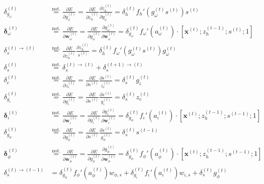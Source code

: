 \documentclass[11pt]{article}
\begin{document}
\begin{align}
    \delta_{g_{\omega}}^{(t)} &\overset{\text{not.}}{=} \displaystyle \frac{\partial E}{\partial g_{\omega}^{(t)}} = \displaystyle \frac{\partial E}{\partial z_{h}^{(t)}} \displaystyle \frac{\partial z_h^{(t)}}{\partial g_{\omega}^{(t)}} = \delta_h^{(t)}f_h'\left(g_{\omega}^{(t)}s^{(t)}\right)s^{(t)} \\
    \boldsymbol{\delta}_{\omega}^{(t)} &\overset{\text{not.}}{=} \displaystyle \frac{\partial E}{\partial \boldsymbol{w}_{\omega}^{(t)}} = \displaystyle \frac{\partial E}{\partial g_{\omega}^{(t)}} \displaystyle \frac{\partial g_{\omega}^{(t)}}{\partial \boldsymbol{w}_{\omega}^{(t)}} = \delta_{g_{\omega}}^{(t)} f_{\omega}'\left(a_{\omega}^{(t)}\right) \cdot \left[\mathbf{x}^{(t)}; z_{h}^{(t-1)}; s^{(t)}; 1\right] \\
    \delta_s^{(t)\rightarrow(t)} &\overset{\text{not.}}{=} \displaystyle \frac{\partial E}{\partial z_h^{(t)}}  \displaystyle \frac{\partial z_h^{(t)}}{s^{(t)}} = \delta_{h}^{(t)} f_{\omega}'(g_{\omega}^{(t)}s^{(t)}) g_{\omega}^{(t)} \\
    \delta_s^{(t)} &\overset{\text{not.}}{=} \delta^{(t) \rightarrow (t)}_s + \delta^{(t+1) \rightarrow (t)}_s \\
    \delta_c^{(t)} &\overset{\text{not.}}{=} \displaystyle \frac{\partial E}{\partial z_c^{(t)}} = \displaystyle \frac{\partial E}{\partial s^{(t)}}  \displaystyle \frac{\partial s^{(t)}}{z_c^{(t)}} = \delta_s^{(t)} g_i^{(t)} \\
    \delta_{g_{\iota}}^{(t)} &\overset{\text{not.}}{=} \displaystyle \frac{\partial E}{\partial g_{\iota}^{(t)}} = \displaystyle \frac{\partial E}{\partial s^{(t)}}  \displaystyle \frac{\partial s^{(t)}}{g_{\iota}^{(t)}} = \delta_s^{(t)} z_c^{(t)} \\
    \boldsymbol{\delta}_{\iota}^{(t)} &\overset{\text{not.}}{=} \displaystyle \frac{\partial E}{\partial \boldsymbol{w}_{\iota}^{(t)}} = \displaystyle \frac{\partial E}{\partial g_{\iota}^{(t)}} \displaystyle \frac{\partial g_{\iota}^{(t)}}{\partial \boldsymbol{w}_{\iota}^{(t)}} = \delta_{g_{\phi}}^{(t)} f_{\iota}'\left(a_{\iota}^{(t)}\right) \cdot \left[\mathbf{x}^{(t)}; z_{h}^{(t-1)}; s^{(t-1)}; 1\right] \\
    \delta_{g_{\phi}}^{(t)} &\overset{\text{not.}}{=} \displaystyle \frac{\partial E}{\partial g_{\phi}^{(t)}} = \displaystyle \frac{\partial E}{\partial s^{(t)}}  \displaystyle \frac{\partial s^{(t)}}{g_{\phi}^{(t)}} = \delta_s^{(t)} s^{(t-1)} \\
    \boldsymbol{\delta}_{\phi}^{(t)} &\overset{\text{not.}}{=} \displaystyle \frac{\partial E}{\partial \boldsymbol{w}_{\phi}^{(t)}} = \displaystyle \frac{\partial E}{\partial g_{\phi}^{(t)}} \displaystyle \frac{\partial g_{\phi}^{(t)}}{\partial \boldsymbol{w}_{\phi}^{(t)}} = \delta_{g_{\phi}}^{(t)} f_{\phi}'\left(a_{\phi}^{(t)}\right) \cdot \left[\mathbf{x}^{(t)}; z_{h}^{(t-1)}; s^{(t-1)}; 1\right] \\
    \delta^{(t) \rightarrow (t-1)}_s &= \delta_{g_{\phi}}^{(t)}f_{\phi}'(a_{\phi}^{(t)})w_{\phi, s} +
        \delta_{g_{\iota}}^{(t)}f_{\iota}'(a_{\iota}^{(t)})w_{\iota, s} +
        \delta_{s}^{(t)}g_{\phi}^{(t)}
\end{align}
\end{document}
